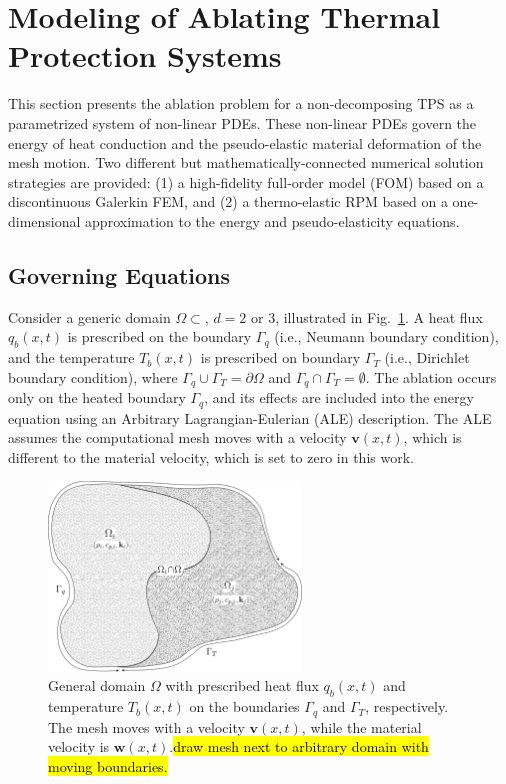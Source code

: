 \section{Modeling of Ablating Thermal Protection Systems}

This section presents the ablation problem for a non-decomposing TPS as a parametrized system of non-linear PDEs. These non-linear PDEs govern the energy of heat conduction and the pseudo-elastic material deformation of the mesh motion. Two different but mathematically-connected numerical solution strategies are provided: (1) a high-fidelity full-order model (FOM) based on a discontinuous Galerkin FEM, and (2) a thermo-elastic RPM based on a one-dimensional approximation to the energy and pseudo-elasticity equations.

\subsection{Governing Equations}

Consider a generic domain $\Omega\subset$, $d=2$ or $3$, illustrated in Fig.~\ref{fig_general_domain}. A heat flux $q_b(x,t)$ is prescribed on the boundary $\Gamma_q$ (i.e., Neumann boundary condition), and the temperature $T_b(x,t)$ is prescribed on boundary $\Gamma_T$ (i.e., Dirichlet boundary condition), where $\Gamma_q\cup\Gamma_T = \partial\Omega$ and $\Gamma_q\cap\Gamma_T = \emptyset$. The ablation occurs only on the heated boundary $\Gamma_q$, and its effects are included into the energy equation using an Arbitrary Lagrangian-Eulerian (ALE) description. The ALE assumes the computational mesh moves with a velocity $\mathbf{v}(x,t)$, which is different to the material velocity, which is set to zero in this work.

\begin{figure}
    \centering
    \includegraphics[width=0.6\textwidth]{./figs/general_domain.png}
    \caption{General domain $\Omega$ with prescribed heat flux $q_b(x,t)$ and temperature $T_b(x,t)$ on the boundaries $\Gamma_q$ and $\Gamma_T$, respectively. The mesh moves with a velocity $\mathbf{v}(x,t)$, while the material velocity is $\mathbf{w}(x,t)$.\hl{draw mesh next to arbitrary domain with moving boundaries.}}
    \label{fig_general_domain}
\end{figure}

